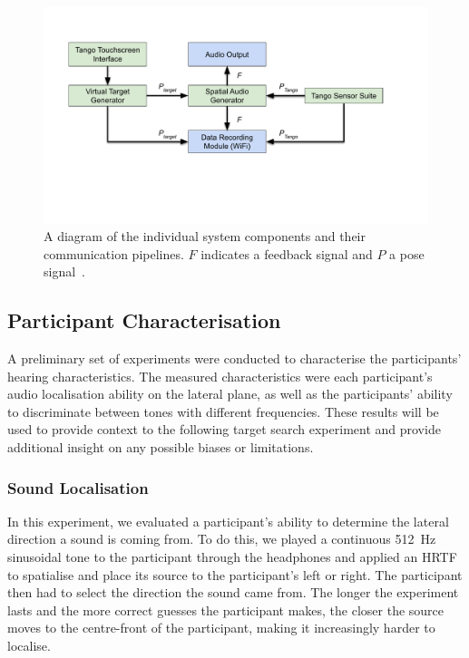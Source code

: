 \documentclass[acmsmall]{acmart}
\begin{document}
\begin{figure}
  \centering
  \includegraphics[clip=true, trim=0 120 80 50, width=0.8\columnwidth]{figures/pipeline.pdf}
  \caption{A diagram of the individual system components and their communication pipelines. $F$ indicates a feedback signal and $P$ a pose signal~\citep{lock2019bone}. }\label{fig:pipeline}
\end{figure}

\subsection{Participant Characterisation}\label{sec:participant_characterisation}

A preliminary set of experiments were conducted to characterise the participants' hearing characteristics.
The measured characteristics were each participant's audio localisation ability on the lateral plane, as well as the participants' ability to discriminate between tones with different frequencies. 
These results will be used to provide context to the following target search experiment and provide additional insight on any possible biases or limitations. 

\subsubsection{Sound Localisation}\label{sec:sound_localisation}

In this experiment, we evaluated a participant's ability to determine the lateral direction a sound is coming from.
To do this, we played a continuous \SI{512}{\hertz} sinusoidal tone to the participant through the headphones and applied an HRTF to spatialise and place its source to the participant's left or right.
The participant then had to select the direction the sound came from.
The longer the experiment lasts and the more correct guesses the participant makes, the closer the source moves to the centre-front of the participant, making it increasingly harder to localise. 
\end{document}
